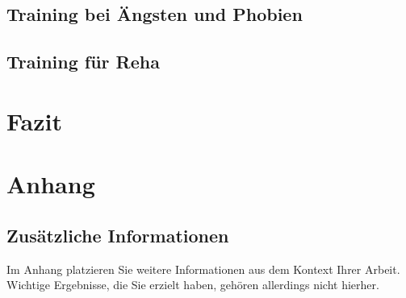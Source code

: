 \documentclass[
    12pt,
    a4paper,
    doubleside,
    BCOR=10mm,
    parskip=half,
    ngerman
]{scrbook}
\begin{document}
\section{Training bei Ängsten und Phobien}\label{sec:ÄuP}

\section{Training für Reha}\label{sec:Reha}




%


% 

\chapter{Fazit}\label{sec:summary}


\backmatter

% 

\singlespacing{}
\printnoidxglossary[type=\acronymtype,title={Abkürzungen\label{akronyme}}]
\printnoidxglossary[title={Glossar}]

\newpage
{}



\newpage
\chapter{Anhang}\label{appendix}
\section{Zusätzliche Informationen}\label{att:bigpicture}
Im Anhang platzieren Sie weitere Informationen aus dem Kontext Ihrer Arbeit.
Wichtige Ergebnisse, die Sie erzielt haben, gehören allerdings nicht hierher.
\end{document}

